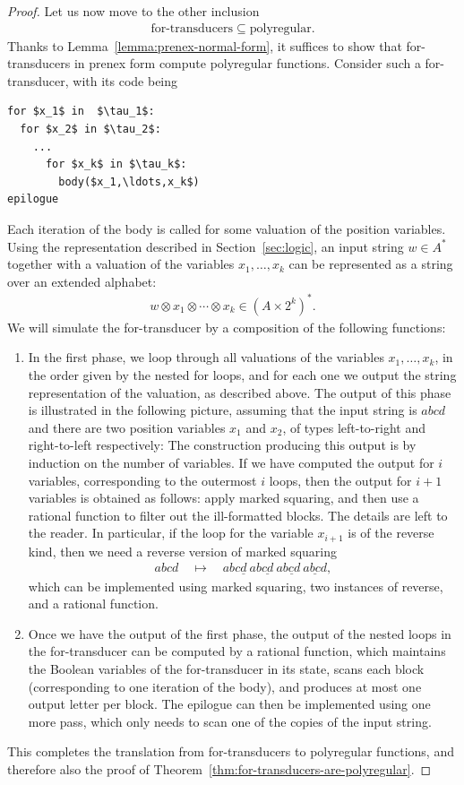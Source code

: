 \begin{proof}
Let us now move to the other inclusion
\begin{align*}
\text{for-transducers} \subseteq \text{polyregular}.
\end{align*}
Thanks to Lemma~\ref{lemma:prenex-normal-form}, it suffices to show that for-transducers in prenex  form compute polyregular functions. Consider such a for-transducer, with its code being 
\begin{lstlisting}
for $x_1$ in  $\tau_1$:
  for $x_2$ in $\tau_2$:
    ...
      for $x_k$ in $\tau_k$:
        body($x_1,\ldots,x_k$)
epilogue
\end{lstlisting}
Each iteration of the body is called for some valuation of the position variables. Using the representation described in Section~\ref{sec:logic}, an input string $w \in A^*$ together with a valuation of the variables $x_1,\ldots,x_k$ can be represented as a string over an extended alphabet:
\begin{align*}
w \otimes {x_1} \otimes \cdots \otimes {x_k} \in (A \times 2^k)^*.
\end{align*}
We will simulate the for-transducer by a composition of the following functions: 
\begin{enumerate}
  \item In the first phase, we loop through all  valuations of the  variables $x_1,\ldots,x_k$, in the order given by the nested for loops, and for each one we output the string representation of the valuation, as described above. The output of this phase is illustrated in the following picture, assuming that the input string is $abcd$ and there are two position variables $x_1$ and $x_2$, of types left-to-right and right-to-left respectively:
  The construction producing this output is by induction on the number of variables. If we have computed the output for $i$ variables, corresponding to the outermost $i$ loops, then the output for $i+1$ variables is obtained as follows: apply marked squaring, and then use a rational function to filter out the ill-formatted blocks. The details are left to the reader. In particular, if the loop for the variable $x_{i+1}$ is of the reverse kind, then we need a reverse version of marked squaring
  \begin{align*}
  abcd \quad \mapsto \quad abc\underline{d}\   ab\underline{cd}\   a\underline{bcd} \  \underline{abcd},
  \end{align*}
  which can be implemented using marked squaring, two instances of reverse, and a rational function.
  \item Once we have the output of the first phase, the output of the nested loops in the for-transducer can be computed by a rational function, which maintains the Boolean variables of the for-transducer in its state, scans each block (corresponding to one iteration of the body), and produces at most one output letter per block. The epilogue can then be implemented using one more pass, which only needs to scan one of the copies of the input string.
\end{enumerate}
This completes the translation from for-transducers to polyregular functions, and therefore also the proof of Theorem~\ref{thm:for-transducers-are-polyregular}.
\end{proof}

